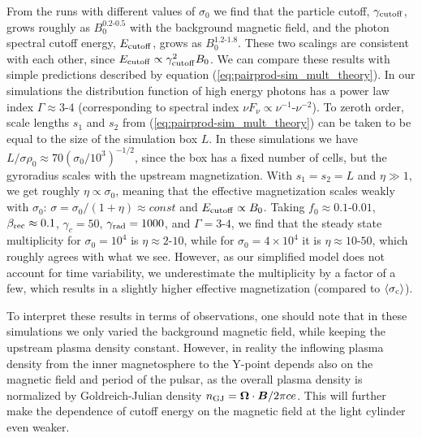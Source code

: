 From the runs with different values of $\sigma_0$ we find that the particle cutoff, $\gamma_{\rm cutoff}$, grows roughly as $B_0^{0.2\text{-}0.5}$ with the background magnetic field, and the photon spectral cutoff energy, $E_{\rm cutoff}$, grows as $B_0^{1.2\text{-}1.8}$. These two scalings are consistent with each other, since $E_{\rm cutoff}\propto \gamma_{\rm cutoff}^2 B_0$. We can compare these results with simple predictions described by equation (\ref{eq:pairprod-sim_mult_theory}). In our simulations the distribution function of high energy photons has a power law index $\Gamma\approx 3\text{-}4$ (corresponding to spectral index $\nu F_{\nu}\propto \nu^{-1}\text{-}\nu^{-2}$). To zeroth order, scale lengths $s_1$ and $s_2$ from  (\ref{eq:pairprod-sim_mult_theory}) can be taken to be equal to the size of the simulation box $L$. In these simulations we have $L / \sigma \rho_0 \approx 70 (\sigma_0 / 10^3)^{-1/2}$, since the box has a fixed number of cells, but the gyroradius scales with the upstream magnetization. With $s_1 = s_2 = L$ and $\eta \gg 1$, we get roughly $\eta \propto \sigma_0$, meaning that the effective magnetization scales weakly with $\sigma_0$: $\sigma = \sigma_0 / (1+\eta) \approx const$ and $E_{\rm cutoff}\propto B_0$.
Taking $f_0\approx 0.1\text{-}0.01$, $\beta_{\rm rec}\approx 0.1$, $\gamma_c = 50$, $\gamma_{\rm rad} = 1000$, and $\Gamma=3\text{-}4$, we find that the steady state multiplicity for $\sigma_0=10^4$ is $\eta\approx 2\text{-}10$, while for $\sigma_0 = 4\times 10^4$ it is $\eta\approx 10\text{-}50$, which roughly agrees with what we see. However, as our simplified model does not account for time variability, we underestimate the multiplicity by a factor of a few, which results in a slightly higher effective magnetization (compared to $\langle\sigma_{\rm c}\rangle$).

To interpret these results in terms of observations, one should note that in these simulations we only varied the background magnetic field, while keeping the upstream plasma density constant. However, in reality the inflowing plasma density from the inner magnetosphere to the Y-point depends also on the magnetic field and period of the pulsar, as the overall plasma density is normalized by Goldreich-Julian density $n_{\rm GJ}=\bm{\Omega}\cdot\bm{B}/2\pi ce$. This will further make the dependence of cutoff energy on the magnetic field at the light cylinder even weaker.

